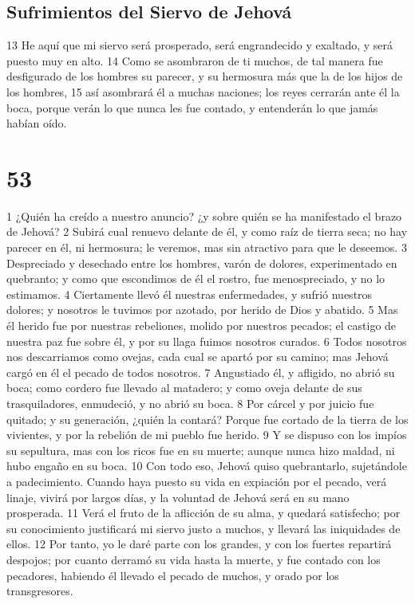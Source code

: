 \section*{Sufrimientos del Siervo de Jehová}

13 He aquí que mi siervo será prosperado, será engrandecido y exaltado, y será puesto muy en alto.
14 Como se asombraron de ti muchos, de tal manera fue desfigurado de los hombres su parecer, y su hermosura más que la de los hijos de los hombres,
15 así asombrará él a muchas naciones; los reyes cerrarán ante él la boca, porque verán lo que nunca les fue contado, y entenderán lo que jamás habían oído. 

\chapter{53}

1 ¿Quién ha creído a nuestro anuncio? ¿y sobre quién se ha manifestado el brazo de Jehová?
2 Subirá cual renuevo delante de él, y como raíz de tierra seca; no hay parecer en él, ni hermosura; le veremos, mas sin atractivo para que le deseemos.
3 Despreciado y desechado entre los hombres, varón de dolores, experimentado en quebranto; y como que escondimos de él el rostro, fue menospreciado, y no lo estimamos.
4 Ciertamente llevó él nuestras enfermedades, y sufrió nuestros dolores; y nosotros le tuvimos por azotado, por herido de Dios y abatido.
5 Mas él herido fue por nuestras rebeliones, molido por nuestros pecados; el castigo de nuestra paz fue sobre él, y por su llaga fuimos nosotros curados. 
6 Todos nosotros nos descarriamos como ovejas, cada cual se apartó por su camino; mas Jehová cargó en él el pecado de todos nosotros.
7 Angustiado él, y afligido, no abrió su boca; como cordero fue llevado al matadero; y como oveja delante de sus trasquiladores, enmudeció, y no abrió su boca.
8 Por cárcel y por juicio fue quitado; y su generación, ¿quién la contará? Porque fue cortado de la tierra de los vivientes, y por la rebelión de mi pueblo fue herido.
9 Y se dispuso con los impíos su sepultura, mas con los ricos fue en su muerte; aunque nunca hizo maldad, ni hubo engaño en su boca. 
10 Con todo eso, Jehová quiso quebrantarlo, sujetándole a padecimiento. Cuando haya puesto su vida en expiación por el pecado, verá linaje, vivirá por largos días, y la voluntad de Jehová será en su mano prosperada.
11 Verá el fruto de la aflicción de su alma, y quedará satisfecho; por su conocimiento justificará mi siervo justo a muchos, y llevará las iniquidades de ellos.
12 Por tanto, yo le daré parte con los grandes, y con los fuertes repartirá despojos; por cuanto derramó su vida hasta la muerte, y fue contado con los pecadores, habiendo él llevado el pecado de muchos, y orado por los transgresores.

